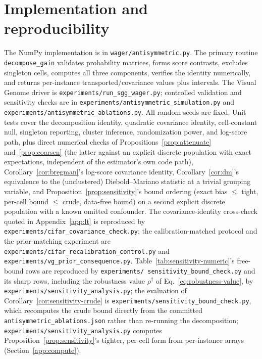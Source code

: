 \section{Implementation and reproducibility}\label{app:implementation}

The NumPy implementation is in \texttt{wager/antisymmetric.py}. The primary routine
\texttt{decompose\_gain} validates probability matrices, forms score contrasts, excludes
singleton cells, computes all three components, verifies the identity numerically, and
returns per-instance transported/covariance values plus intervals. The Visual Genome
driver is \texttt{experiments/\allowbreak run\_sgg\_wager.py}; controlled validation and sensitivity
checks are in \texttt{experiments/\allowbreak antisymmetric\_simulation.py} and
\texttt{experiments/\allowbreak antisymmetric\_ablations.py}. All random seeds are fixed. Unit tests
cover the decomposition identity, quadratic covariance identity, cell-constant null,
singleton reporting, cluster inference, randomization power, and log-score path, plus
direct numerical checks of Propositions~\ref{prop:attenuate} and~\ref{prop:coarsen}
(the latter against an explicit discrete population with exact expectations, independent
of the estimator's own code path), Corollary~\ref{cor:bregman}'s log-score covariance
identity, Corollary~\ref{cor:dm}'s equivalence to the (unclustered) Diebold--Mariano
statistic at a trivial grouping variable, and Proposition~\ref{prop:sensitivity}'s bound
ordering (exact bias $\le$ tight, per-cell bound $\le$ crude, data-free bound) on a second
explicit discrete population with a known omitted confounder. The covariance-identity
cross-check quoted in
Appendix~\ref{app:lt} is reproduced by
\texttt{experiments/\allowbreak cifar\_covariance\_check.py}; the calibration-matched
protocol and the prior-matching experiment are
\texttt{experiments/\allowbreak cifar\_recalibration\_control.py} and
\texttt{experiments/\allowbreak vg\_prior\_consequence.py}. Table~\ref{tab:sensitivity-numeric}'s
free-bound rows are reproduced by \texttt{experiments/\allowbreak
sensitivity\_bound\_check.py} and its sharp rows, including the robustness value
$\rho^\dagger$ of Eq.~\eqref{eq:robustness-value}, by
\texttt{experiments/\allowbreak sensitivity\_analysis.py}; the evaluation of
Corollary~\ref{cor:sensitivity-crude} is
\texttt{experiments/\allowbreak sensitivity\_bound\_check.py}, which recomputes the crude
bound directly from the committed \texttt{antisymmetric\_ablations.json} rather than
re-running the decomposition; \texttt{experiments/\allowbreak sensitivity\_analysis.py}
computes Proposition~\ref{prop:sensitivity}'s tighter, per-cell form from per-instance
arrays (Section~\ref{app:compute}).

